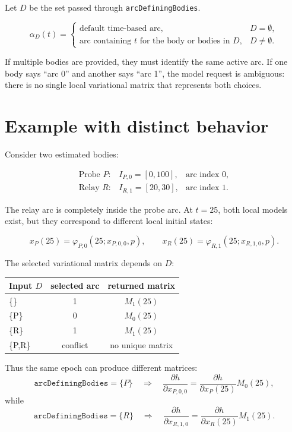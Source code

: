 \documentclass[11pt,a4paper]{article}
\begin{document}
Let \(D\) be the set passed through \texttt{arcDefiningBodies}.

\[
\alpha_D(t) =
\begin{cases}
\text{default time-based arc}, & D = \emptyset, \\
\text{arc containing } t \text{ for the body or bodies in } D, & D \neq \emptyset.
\end{cases}
\]

If multiple bodies are provided, they must identify the same active arc. If one
body says ``arc 0'' and another says ``arc 1'', the model request is ambiguous:
there is no single local variational matrix that represents both choices.

\section*{Example with distinct behavior}

Consider two estimated bodies:

\[
\begin{array}{ccl}
\text{Probe } P:  & I_{P,0} = [0,100], & \text{arc index } 0, \\
\text{Relay } R:  & I_{R,1} = [20,30], & \text{arc index } 1.
\end{array}
\]

The relay arc is completely inside the probe arc. At \(t=25\), both local models
exist, but they correspond to different local initial states:

\[
    x_P(25) = \varphi_{P,0}(25; x_{P,0,0}, p),
    \qquad
    x_R(25) = \varphi_{R,1}(25; x_{R,1,0}, p).
\]

The selected variational matrix depends on \(D\):

\begin{center}
\begin{tabular}{>{\ttfamily}lcc}
\toprule
\normalfont Input \(D\) & selected arc & returned matrix \\
\midrule
\{\}        & 1 & \(M_1(25)\) \\
\{P\}       & 0 & \(M_0(25)\) \\
\{R\}       & 1 & \(M_1(25)\) \\
\{P,R\}     & conflict & no unique matrix \\
\bottomrule
\end{tabular}
\end{center}

Thus the same epoch can produce different matrices:
\[
    \texttt{arcDefiningBodies}=\{P\}
    \quad \Rightarrow \quad
    \frac{\partial h}{\partial x_{P,0,0}}
    =
    \frac{\partial h}{\partial x_P(25)} M_0(25),
\]
while
\[
    \texttt{arcDefiningBodies}=\{R\}
    \quad \Rightarrow \quad
    \frac{\partial h}{\partial x_{R,1,0}}
    =
    \frac{\partial h}{\partial x_R(25)} M_1(25).
\]
\end{document}
